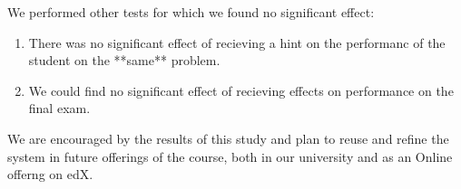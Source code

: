 \documentclass{llncs2e/llncs}
\begin{document}
We performed other tests for which we found no significant effect:
\begin{enumerate}
\item There was no significant effect of recieving a hint on the
  performanc of the student on the **same** problem.
\item We could find no significant effect of recieving effects on
  performance on the final exam.
\end{enumerate}

We are encouraged by the results of this study and plan to reuse and
refine the system in future offerings of the course, both in our
university and as an Online offerng on edX.



\end{document}
